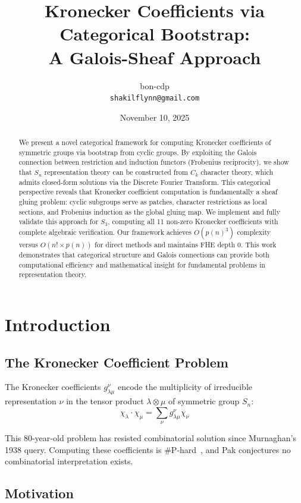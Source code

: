 \documentclass[11pt]{article}
\title{Kronecker Coefficients via Categorical Bootstrap: \\
A Galois-Sheaf Approach}
\author{bon-cdp \\
\texttt{shakilflynn@gmail.com}}
\date{November 10, 2025}
\theoremstyle{definition}
\theoremstyle{remark}
\begin{document}
\maketitle

\begin{abstract}
We present a novel categorical framework for computing Kronecker coefficients of symmetric groups via bootstrap from cyclic groups. By exploiting the Galois connection between restriction and induction functors (Frobenius reciprocity), we show that $S_n$ representation theory can be constructed from $C_k$ character theory, which admits closed-form solutions via the Discrete Fourier Transform. This categorical perspective reveals that Kronecker coefficient computation is fundamentally a sheaf gluing problem: cyclic subgroups serve as patches, character restrictions as local sections, and Frobenius induction as the global gluing map. We implement and fully validate this approach for $S_3$, computing all 11 non-zero Kronecker coefficients with complete algebraic verification. Our framework achieves $O(p(n)^3)$ complexity versus $O(n! \times p(n))$ for direct methods and maintains FHE depth 0. This work demonstrates that categorical structure and Galois connections can provide both computational efficiency and mathematical insight for fundamental problems in representation theory.
\end{abstract}

\section{Introduction}

\subsection{The Kronecker Coefficient Problem}

The Kronecker coefficients $g^\nu_{\lambda\mu}$ encode the multiplicity of irreducible representation $\nu$ in the tensor product $\lambda \otimes \mu$ of symmetric group $S_n$:
\begin{equation}
\chi_\lambda \cdot \chi_\mu = \sum_{\nu} g^\nu_{\lambda\mu} \chi_\nu
\end{equation}

This 80-year-old problem has resisted combinatorial solution since Murnaghan's 1938 query. Computing these coefficients is \#P-hard~\cite{pak2023}, and Pak conjectures no combinatorial interpretation exists.

\subsection{Motivation}
\end{document}
